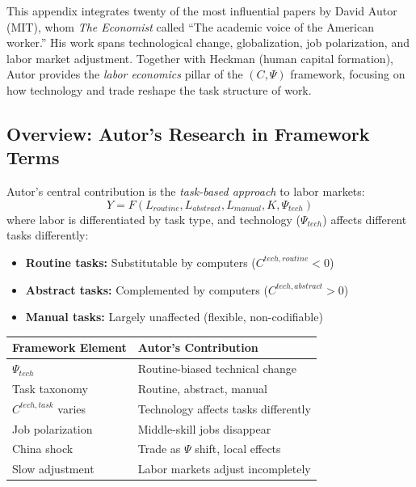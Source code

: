 \documentclass[12pt,a4paper]{article}
\begin{document}
This appendix integrates twenty of the most influential papers by David Autor
(MIT), whom \emph{The Economist} called ``The academic voice of the American worker.''
His work spans technological change, globalization, job polarization, and
labor market adjustment. Together with Heckman (human capital formation),
Autor provides the \emph{labor economics} pillar of the $(C, \Psi)$ framework,
focusing on how technology and trade reshape the task structure of work.

\subsection{Overview: Autor's Research in Framework Terms}

Autor's central contribution is the \emph{task-based approach} to labor markets:
\begin{equation}
  Y = F(L_{routine}, L_{abstract}, L_{manual}, K, \Psi_{tech})
\end{equation}
where labor is differentiated by task type, and technology ($\Psi_{tech}$)
affects different tasks differently:
\begin{itemize}
  \item \textbf{Routine tasks:} Substitutable by computers ($C^{tech,routine} < 0$)
  \item \textbf{Abstract tasks:} Complemented by computers ($C^{tech,abstract} > 0$)
  \item \textbf{Manual tasks:} Largely unaffected (flexible, non-codifiable)
\end{itemize}

\begin{center}
\renewcommand{\arraystretch}{1.2}
\small
\begin{tabular}{ll}
\hline
\textbf{Framework Element} & \textbf{Autor's Contribution} \\
\hline
$\Psi_{tech}$ & Routine-biased technical change \\
Task taxonomy & Routine, abstract, manual \\
$C^{tech,task}$ varies & Technology affects tasks differently \\
Job polarization & Middle-skill jobs disappear \\
China shock & Trade as $\Psi$ shift, local effects \\
Slow adjustment & Labor markets adjust incompletely \\
\hline
\end{tabular}
\end{center}
\end{document}
